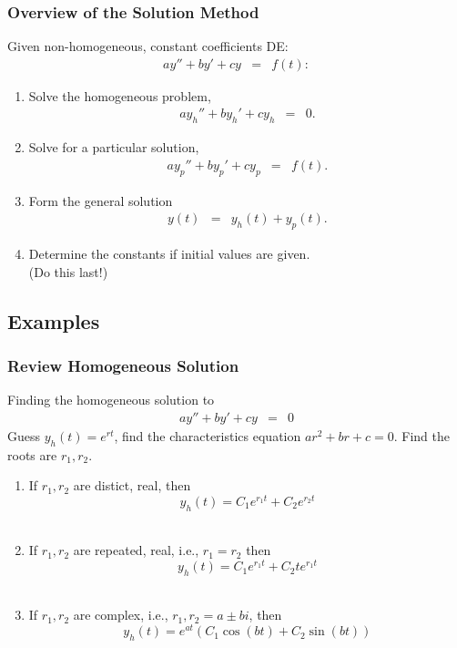 \begin{frame}
  \frametitle{Overview of the Solution Method}

  Given non-homogeneous, constant coefficients DE:
  \begin{eqnarray*}
    a y'' + by' + cy & = & f(t):
  \end{eqnarray*}
  \begin{enumerate}
  \item Solve the homogeneous problem,
    \begin{eqnarray*}
      a y_h'' + by_h' + cy_h & = & 0.
    \end{eqnarray*}
  \item Solve for a particular solution,
    \begin{eqnarray*}
      a y_p'' + by_p' + cy_p & = & f(t).
    \end{eqnarray*}
  \item Form the general solution
   {\color{red} \begin{eqnarray*}
      y(t) & = & y_h(t) + y_p(t).
    \end{eqnarray*}}
  \item Determine the constants if initial values are given. \\
    (Do this last!)
  \end{enumerate}


\end{frame}

\subsection{Examples}

\begin{frame}
  \frametitle{Review Homogeneous Solution}
   Finding the homogeneous solution to
     \begin{eqnarray*}
      a y'' + b y' + cy  & =& 0
    \end{eqnarray*}
   Guess
       {\color{red}$y_h(t)=e^{rt}$}, find the characteristics equation
       {\color{red}$ar^2+br+c = 0.$}
  Find the roots are {\color{red}$r_1, r_2$}.
  \begin{enumerate}
  \item If {\color{blue}$r_1, r_2$ are distict, real}, then
      {\color{red}$$y_h(t) = C_1e^{r_1t}+C_2e^{r_2t}$$}\\
  \item If {\color{blue}$r_1, r_2$ are repeated, real}, i.e., $r_1 = r_2$ then
     {\color{red}$$y_h(t) = C_1e^{r_1t}+C_2te^{r_1t}$$}\\
  \item If {\color{blue}$r_1, r_2$ are complex}, i.e., $r_1, r_2 = a\pm bi$,
      then
      {\color{red}$$y_h(t) = e^{at}\left(C_1\cos(bt)+C_2\sin(bt)\right)$$}
  \end{enumerate}

\end{frame}


